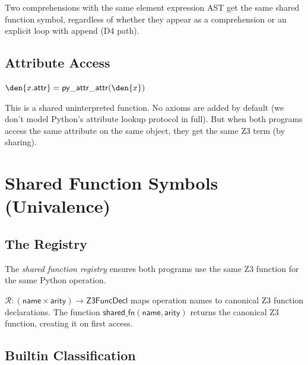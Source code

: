 Two comprehensions with the same element expression AST get the same
shared function symbol, regardless of whether they appear as a
comprehension or an explicit loop with append (D4 path).

\subsection{Attribute Access}

\begin{definition}
$\den{x.\mathsf{attr}} = \mathsf{py\_attr\_attr}(\den{x})$

This is a shared uninterpreted function.  No axioms are added by
default (we don't model Python's attribute lookup protocol in full).
But when both programs access the same attribute on the same object,
they get the same Z3 term (by sharing).
\end{definition}


\section{Shared Function Symbols (Univalence)}

\subsection{The Registry}

The \emph{shared function registry} ensures both programs use the
same Z3 function for the same Python operation.

\begin{definition}
$\mathcal{R} : (\mathsf{name} \times \mathsf{arity}) \to
\mathsf{Z3FuncDecl}$ maps operation names to canonical Z3 function
declarations.  The function $\mathsf{shared\_fn}(\mathsf{name},
\mathsf{arity})$ returns the canonical Z3 function, creating it on
first access.
\end{definition}

\subsection{Builtin Classification}

